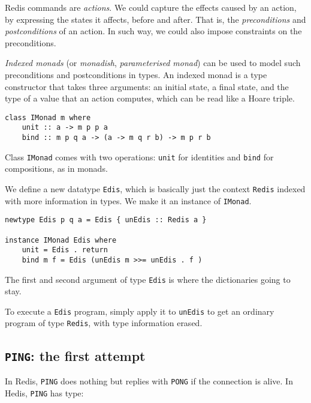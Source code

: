 \documentclass[pldi]{sigplanconf-pldi16}
\begin{document}
Redis commands are \emph{actions}.
 We could capture the effects caused by an action, by expressing the states it
 affects, before and after. That is, the \emph{preconditions} and
 \emph{postconditions} of an action. In such way, we could also impose
 constraints on the preconditions.

\emph{Indexed monads} (or \emph{monadish},
 \emph{parameterised monad})\cite{indexedmonad}
 can be used\cite{typefun}\cite{staticresources} to model such preconditions and
 postconditions in types. An indexed monad is a type constructor that takes
 three arguments: an initial state, a final state, and the type of a value that
 an action computes, which can be read like a Hoare triple\cite{kleisli}.

\begin{verbatim}
class IMonad m where
    unit :: a -> m p p a
    bind :: m p q a -> (a -> m q r b) -> m p r b
\end{verbatim}

Class \texttt{IMonad} comes with two operations:
 \texttt{unit} for identities and \texttt{bind} for
 compositions, as in monads.

We define a new datatype \texttt{Edis}, which is basically just
 the context \texttt{Redis} indexed with more information in types.
 We make it an instance of \texttt{IMonad}.

\begin{verbatim}
newtype Edis p q a = Edis { unEdis :: Redis a }

instance IMonad Edis where
    unit = Edis . return
    bind m f = Edis (unEdis m >>= unEdis . f )
\end{verbatim}

The first and second argument of type \texttt{Edis} is where the
dictionaries going to stay.

To execute a \texttt{Edis} program, simply apply it to
 \texttt{unEdis} to get an ordinary program of type
 \texttt{Redis}, with type information erased.

\subsection{\texttt{PING}: the first attempt}

In Redis, \texttt{PING} does nothing but replies with
 \texttt{PONG} if the connection is alive. In Hedis,
 \texttt{PING} has type:
\end{document}
